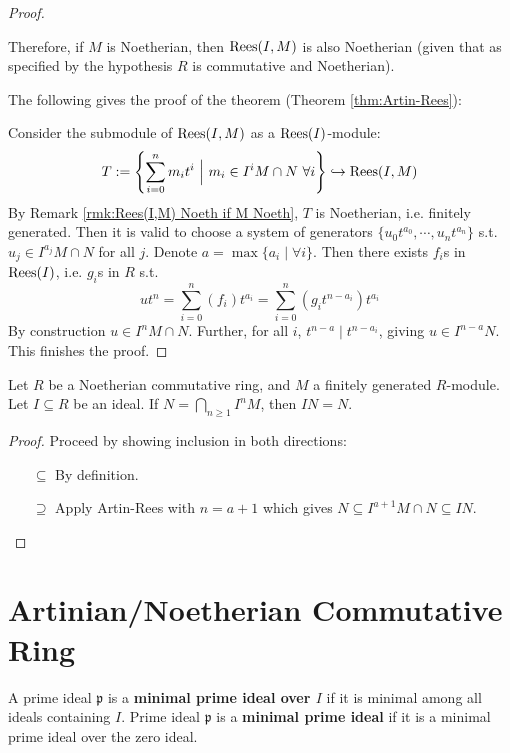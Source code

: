 \documentclass{article}
\begin{document}
\begin{proof}
\begin{remark}
        Therefore, if $M$ is Noetherian, then $\mathrm{Rees}(I, M)$ is also Noetherian (given that as specified by the hypothesis $R$ is commutative and Noetherian).
    \end{remark}

    The following gives the proof of the theorem (Theorem \ref{thm:Artin-Rees}):

    Consider the submodule of $\mathrm{Rees}(I, M)$ as a $\mathrm{Rees}(I)$-module:
    \[
        T := \left\{ \sum\limits_{i=0}^n m_i t^i \ \Big|\  m_i\in I^i M\cap N\ \forall i \right\} \hookrightarrow \mathrm{Rees}(I, M)
    \]
    By Remark \ref{rmk:Rees(I,M) Noeth if M Noeth}, $T$ is Noetherian, i.e. finitely generated. Then it is valid to choose a system of generators $\{ u_0 t^{a_0}, \cdots, u_n t^{a_n} \}$ s.t. $u_j \in I^{a_j} M \cap N$ for all $j$. Denote $a = \max\{ a_i \mid \forall i \}$. Then there exists $f_i$s in $\mathrm{Rees}(I)$, i.e. $g_i$s in $R$ s.t.
    \[
        ut^n = \sum\limits_{i=0}^n (f_i) t^{a_i} = \sum\limits_{i=0}^n (g_i t^{n - a_i}) t^{a_i}
    \]
    By construction $u\in I^nM\cap N$. Further, for all $i$, $t^{n-a} \mid t^{n-a_i}$, giving $u\in I^{n-a}N$. This finishes the proof. 
\end{proof}

\begin{theorem}\label{thm:Krull's Intersection}
    Let $R$ be a Noetherian commutative ring, and $M$ a finitely generated $R$-module. Let $I\subseteq R$ be an ideal. If $N = \bigcap_{n\geq 1} I^n M$, then $IN = N$.
\end{theorem}

\begin{proof}
    Proceed by showing inclusion in both directions:
    \begin{itemize}
        \item[$\subseteq$] By definition.
        \item[$\supseteq$] Apply Artin-Rees with $n= a + 1$ which gives $N \subseteq I^{a+1}M \cap N \subseteq IN$.
    \end{itemize}
\end{proof}

\section{Artinian/Noetherian Commutative Ring}

\begin{definition}
    A prime ideal $\mathfrak{p}$ is a \textbf{minimal prime ideal over $I$} if it is minimal among all ideals containing $I$. Prime ideal $\mathfrak{p}$ is a \textbf{minimal prime ideal} if it is a minimal prime ideal over the zero ideal.
\end{definition}
\end{document}
